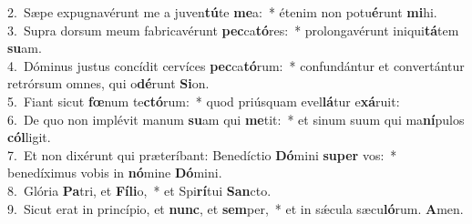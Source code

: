 {2.~}Sæpe expugnavérunt me a juven\textbf{tú}te \textbf{me}a:~* étenim non potu\textbf{é}runt \textbf{mi}hi.\\
{3.~}Supra dorsum meum fabricavérunt \textbf{pec}ca\textbf{tó}res:~* prolongavérunt iniqui\textbf{tá}tem \textbf{su}am.\\
{4.~}Dóminus justus concídit cervíces \textbf{pec}ca\textbf{tó}rum:~* confundántur et convertántur retrórsum omnes, qui o\textbf{dé}runt \textbf{Si}on.\\
{5.~}Fiant sicut \textbf{fœ}num te\textbf{ctó}rum:~* quod priúsquam evel\textbf{lá}tur e\textbf{xá}ruit:\\
{6.~}De quo non implévit manum \textbf{su}am qui \textbf{me}tit:~* et sinum suum qui ma\textbf{ní}pulos \textbf{cól}ligit.\\
{7.~}Et non dixérunt qui præteríbant: Benedíctio \textbf{Dó}mini \textbf{su}\textbf{per} vos:~* benedíximus vobis in \textbf{nó}mine \textbf{Dó}mini.\\
{8.~}Glória \textbf{Pa}tri, et \textbf{Fí}\textbf{li}o,~* et Spi\textbf{rí}tui \textbf{San}cto.\\
{9.~}Sicut erat in princípio, et \textbf{nunc}, et \textbf{sem}per,~* et in sǽcula sæcu\textbf{ló}rum. \textbf{A}men.\\
